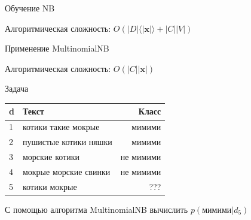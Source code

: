 \documentclass[aspectratio=169]{beamer}
\begin{document}
\begin{frame}{Обучение NB}

\nbtrain

\vspace{1em}
Алгоритмическая сложность: $O(|D| \langle |\mathbf{x}| \rangle + |C||V|)$

\end{frame}



\begin{frame}{Применение MultinomialNB}

\nbapply

\vspace{1em}
Алгоритмическая сложность: $O(|C||\mathbf{x}|)$

\end{frame}


\begin{frame}{Задача}

\begin{tabular}{l p{7cm} r}
d & Текст & Класс \\
\hline
1 & котики такие мокрые & мимими \\
2 & пушистые котики няшки & мимими \\
3 & морские котики  & не мимими \\
4 & мокрые морские свинки & не мимими \\
\hline
5 & котики мокрые & ???
\end{tabular}

\vspace{1em}
С помощью алгоритма MultinomialNB вычислить $p(\text{мимими} | d_5)$

\end{frame}

\end{document}
